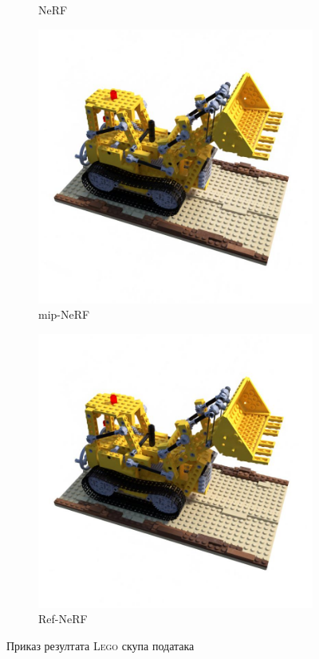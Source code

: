 \documentclass[12pt, a4paper, twoside]{book}
\numberwithin{equation}{chapter}
\numberwithin{theorem}{section}
\numberwithin{definition}{section}
\numberwithin{definitionChapter}{chapter}
\begin{document}
\begin{figure}[H]
\begin{subfigure}{0.475\textwidth}
			\caption{NeRF}
		\end{subfigure}
		\begin{subfigure}{0.475\textwidth}
			\centering
			\includegraphics[scale=0.25]{img/mipnerf/mipnerf_lego_31.jpg}
			\caption{mip-NeRF}
		\end{subfigure}
		\begin{subfigure}{0.475\textwidth}
			\centering
			\includegraphics[scale=0.25]{img/refnerf/refnerf_lego_31.jpg}
			\caption{Ref-NeRF}
		\end{subfigure}
		\caption{Приказ резултата \textsc{Lego} скупа података}
		\vspace{5in}
		\label{fig-lego-results}
	\end{figure}
\end{document}

